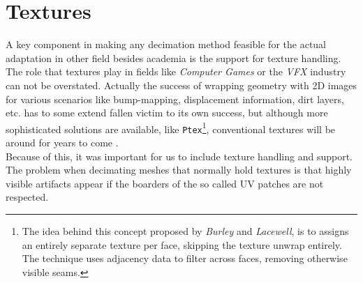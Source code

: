 \section{Textures}
\label{topstoc42}

A key component in making any decimation method feasible for the actual adaptation in other field besides academia is the support for texture handling.
The role that textures play in fields like \textit{Computer Games} or the \textit{VFX} industry can not be overstated.
Actually the success of wrapping geometry with 2D images for various scenarios like bump-mapping, displacement information, dirt layers, etc. has to some extend fallen victim to its own success, but although more sophisticated solutions are available, like \texttt{Ptex}\footnote{ The idea behind this concept proposed by \textit{Burley} and \textit{Lacewell}, is to assigns an entirely separate texture per face, skipping the texture unwrap entirely.  The technique uses adjacency data to filter across faces, removing otherwise visible seams.}, conventional textures will be around for years to come \citep[cf.][\texttt{Ptex} opposed to MeshColors is a fully-fledged concept that has been already successfully used]{Burley2008}.\\
Because of this, it was important for us to include texture handling and support.
The problem when decimating meshes that normally hold textures is that highly visible artifacts appear if the boarders of the so called UV patches are not respected.

